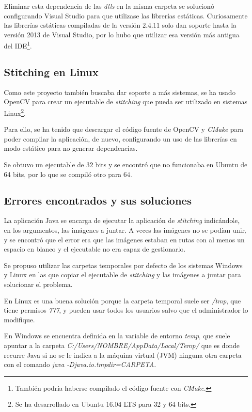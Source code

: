 Eliminar esta dependencia de las \textit{dlls} en la misma carpeta se solucionó configurando Visual Studio para que utilizase las librerías estáticas. Curiosamente las librerías estáticas compiladas de la versión 2.4.11 solo dan soporte hasta la versión 2013 de Visual Studio, por lo hubo que utilizar esa versión más antigua del IDE\footnote{También podría haberse compilado el código fuente con \textit{CMake}.}.

\pagebreak
\subsection{Stitching en Linux}
Como este proyecto también buscaba dar soporte a más sistemas, se ha usado OpenCV para crear un ejecutable de \textit{stitching} que pueda ser utilizado en sistemas Linux\footnote{Se ha desarrollado en Ubuntu 16.04 LTS para 32 y 64 bits.}.

Para ello, se ha tenido que descargar el código fuente de OpenCV y \textit{CMake} para poder compilar la aplicación, de nuevo, configurando un uso de las librerías en modo estático para no generar dependencias. 

Se obtuvo un ejecutable de 32 bits y se encontró que no funcionaba en Ubuntu de 64 bits, por lo que se compiló otro para 64.
 
\subsection{Errores encontrados y sus soluciones}
La aplicación Java se encarga de ejecutar la aplicación de \textit{stitching} indicándole, en los argumentos, las imágenes a juntar. A veces las imágenes no se podían unir, y se encontró que el error era que las imágenes estaban en rutas con al menos un espacio en blanco y el ejecutable no era capaz de gestionarlo.

Se propuso utilizar las carpetas temporales por defecto de los sistemas Windows y Linux en las que copiar el ejecutable de \textit{stitching} y las imágenes a juntar para solucionar el problema. 

En Linux es una buena solución porque la carpeta temporal suele ser \textit{/tmp}, que tiene permisos \textit{777}, y pueden usar todos los usuarios salvo que el administrador lo modifique. 

En Windows se encuentra definida en la variable de entorno \textit{temp}, que suele apuntar a la carpeta \textit{C:/Users/NOMBRE/AppData/Local/Temp/} que es donde recurre Java si no se le indica a la máquina virtual (JVM) ninguna otra carpeta con el comando \textit{java -Djava.io.tmpdir=CARPETA}.

